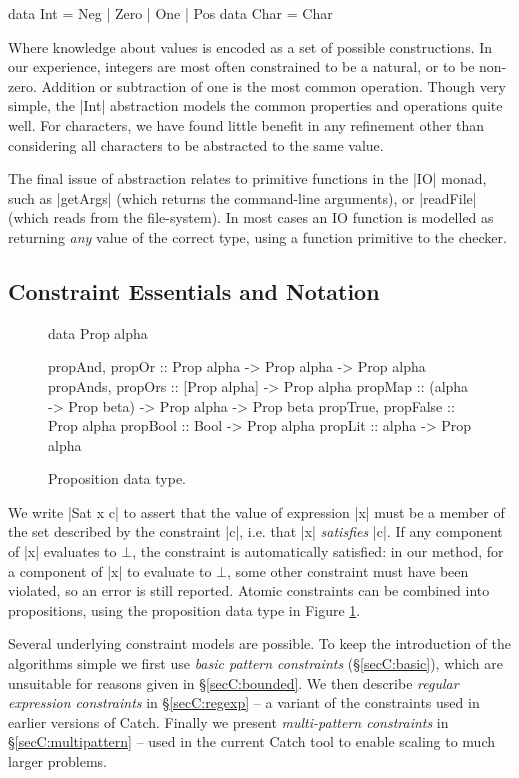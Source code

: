 \begin{code}
data Int = Neg | Zero | One | Pos
data Char = Char
\end{code}

Where knowledge about values is encoded as a set of possible constructions. In our experience, integers are most often constrained to be a natural, or to be non-zero. Addition or subtraction of one is the most common operation. Though very simple, the |Int| abstraction models the common properties and operations quite well. For characters, we have found little benefit in any refinement other than considering all characters to be abstracted to the same value.

The final issue of abstraction relates to primitive functions in the |IO| monad, such as |getArgs| (which returns the command-line arguments), or |readFile| (which reads from the file-system). In most cases an IO function is modelled as returning \textit{any} value of the correct type, using a function primitive to the checker.

\subsection{Constraint Essentials and Notation}
\label{secC:constraints}

\begin{figure}
\begin{code}
data Prop alpha

propAnd, propOr           :: Prop alpha -> Prop alpha -> Prop alpha
propAnds, propOrs         :: [Prop alpha] -> Prop alpha
propMap                   :: (alpha -> Prop beta) -> Prop alpha -> Prop beta
propTrue, propFalse       :: Prop alpha
propBool                  :: Bool -> Prop alpha
propLit                   :: alpha -> Prop alpha
\end{code}
\caption{Proposition data type.}
\label{figC:prop}
\end{figure}

We write |Sat x c| to assert that the value of expression |x| must be a member of the set described by the constraint |c|, i.e. that |x| \textit{satisfies} |c|. If any component of |x| evaluates to $\bot{}$, the constraint is automatically satisfied: in our method, for a component of |x| to evaluate to $\bot{}$, some other constraint must have been violated, so an error is still reported. Atomic constraints can be combined into propositions, using the proposition data type in Figure \ref{figC:prop}.

Several underlying constraint models are possible. To keep the introduction of the algorithms simple we first use \textit{basic pattern constraints} (\S\ref{secC:basic}), which are unsuitable for reasons given in \S\ref{secC:bounded}. We then describe \textit{regular expression constraints} in \S\ref{secC:regexp} -- a variant of the constraints used in earlier versions of Catch. Finally we present \textit{multi-pattern constraints} in \S\ref{secC:multipattern} -- used in the current Catch tool to enable scaling to much larger problems.


